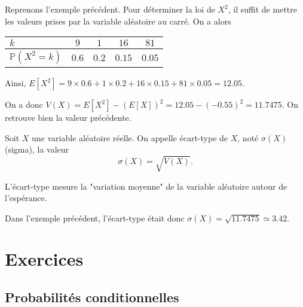 \documentclass[11pt,fleqn, openany]{book} %
\begin{document}
\begin{example}
Reprenons l'exemple précédent. Pour déterminer la loi de $X^2$, il suffit de mettre les valeurs prises par la variable aléatoire au carré. On a alors

\renewcommand{\arraystretch}{2.2}
\begin{center}
\begin{tabular}{|l|c|c|c|c|}
\hline
$k$ & $9$& $1$ & $16$ & $81$ \\
\hline
$\mathbb{P}(X^2=k)$ & $0.6$ & $0.2$ & $0.15$ & $0.05$\\
\hline \end{tabular}
\end{center}

Ainsi, $E[X^2]=9 \times 0.6 +1 \times 0.2+16 \times 0.15+81 \times 0.05=12.05$.

On a donc $V(X)=E[X^2]-(E[X])^2=12.05-(-0.55)^2=11.7475$. On retrouve bien la valeur précédente.

\end{example}

\begin{definition} Soit $X$ une variable aléatoire réelle. On appelle écart-type de $X$, noté $\sigma(X)$ (sigma), la valeur
\[ \sigma (X)= \sqrt{V(X)}.\]\end{definition}

L'écart-type mesure la "variation moyenne" de la variable aléatoire autour de l'espérance.

\begin{example}Dans l'exemple précédent, l'écart-type était donc $\sigma(X)=\sqrt{11.7475}\simeq 3.42$.\end{example}

\chapter*{Exercices}

\section*{Probabilités conditionnelles}
\end{document}
